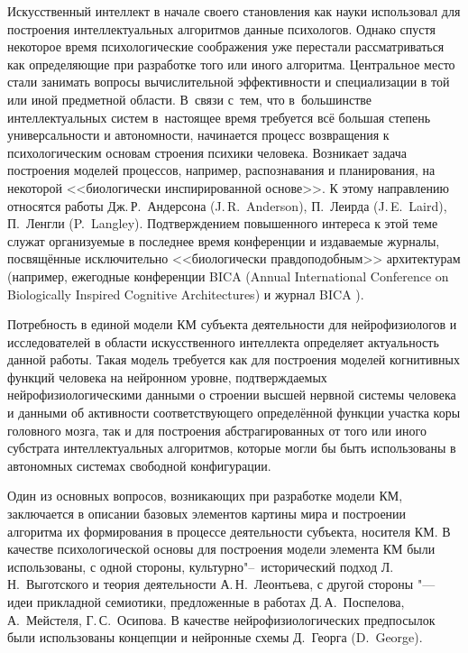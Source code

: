 Искусственный интеллект в начале своего становления как науки использовал для построения интеллектуальных алгоритмов данные психологов. Однако спустя некоторое время психологические соображения уже перестали рассматриваться как определяющие при разработке того или иного алгоритма. Центральное место стали занимать вопросы вычислительной эффективности и специализации в той или иной предметной области. В~связи с~тем, что в~большинстве интеллектуальных систем в~настоящее время требуется всё большая степень универсальности и автономности, начинается процесс возвращения к психологическим основам строения психики человека. Возникает задача построения моделей процессов, например, распознавания и планирования, на некоторой <<биологически инспирированной основе>>. К этому направлению относятся работы Дж.\,Р.~Андерсона (J.\,R.~Anderson), П.~Леирда (J.\,E.~Laird), П.~Ленгли (P.~Langley). Подтверждением повышенного интереса к этой теме служат организуемые в последнее время конференции и издаваемые журналы, посвящённые исключительно <<биологически правдоподобным>> архитектурам (например, ежегодные конференции BICA (Annual International Conference on Biologically Inspired Cognitive Architectures)\cite{BICAC2014} и журнал BICA \cite{BICAJ2014}).

Потребность в единой модели КМ субъекта деятельности для нейрофизиологов и исследователей в области искусственного интеллекта определяет актуальность данной работы. Такая модель требуется как для построения моделей когнитивных функций человека на нейронном уровне, подтверждаемых нейрофизиологическими данными о строении высшей нервной системы человека и данными об активности соответствующего определённой функции участка коры головного мозга, так и для построения абстрагированных от того или иного субстрата интеллектуальных алгоритмов, которые могли бы быть использованы в автономных системах свободной конфигурации.

Один из основных вопросов, возникающих при разработке модели КМ, заключается в описании базовых элементов картины мира и построении алгоритма их формирования в процессе деятельности субъекта, носителя КМ. В качестве психологической основы для построения модели элемента КМ были использованы, с одной стороны, культурно"--~исторический подход Л.\,Н.~Выготского и теория деятельности А.\,Н.~Леонтьева, с другой стороны "--- идеи прикладной семиотики, предложенные в работах Д.\,А.~Поспелова, А.~Мейстеля, Г.\,С.~Осипова. В качестве нейрофизиологических предпосылок были использованы концепции и нейронные схемы Д.~Георга (D.~George).

